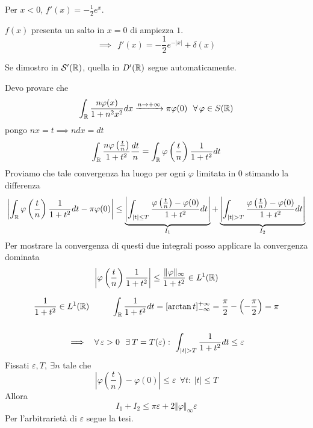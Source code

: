 Per $x < 0$, $f'(x) = - \frac{1}{2} e^{x}$.

$f(x)$ presenta un salto in $x = 0$ di ampiezza $1$.
\begin{equation*}
\implies \ \ f'(x) = - \frac{1}{2} e^{- | x|} + \delta (x)
\end{equation*}
\Soluzione


Se dimostro in $\mathcal{S} '(\mathbb{R})$, quella in $D'(\mathbb{R})$ segue automaticamente.

Devo provare che
\begin{equation*}
\int_{\RR}\frac{n\varphi (x)}{1 + n^{2} x^{2}} dx\xrightarrow{n\rightarrow + \infty} \pi \varphi (0) \ \ \forall \varphi \in S(\RR)
\end{equation*}
pongo $nx = t\implies ndx = dt$
\begin{equation*}
\int_{\mathbb{R}}\frac{n\varphi \left(\frac{t}{n}\right)}{1 + t^{2}}\frac{dt}{n} = \int_{\mathbb{R}} \varphi \left(\frac{t}{n}\right)\frac{1}{1 + t^{2}} dt
\end{equation*}
Proviamo che tale convergenza ha luogo per ogni $\varphi $ limitata in $0$ stimando la differenza
\begin{equation*}
\left| \int_{\mathbb{R}} \varphi \left(\frac{t}{n}\right)\frac{1}{1 + t^{2}} dt - \pi \varphi (0)\right| \leq \underbrace{\left| \int_{| t| \leq T}\frac{\varphi \left(\frac{t}{n}\right) - \varphi (0)}{1 + t^{2}} dt\right|}_{I_{1}} + \underbrace{\left| \int_{| t| > T}\frac{\varphi \left(\frac{t}{n}\right) - \varphi (0)}{1 + t^{2}} dt\right|}_{I_{2}}
\end{equation*}
Per mostrare la convergenza di questi due integrali posso applicare la convergenza dominata
\begin{equation*}
\left| \varphi \left(\frac{t}{n}\right)\frac{1}{1 + t^{2}}\right| \leq \frac{\Vert \varphi \Vert_{\infty}}{1 + t^{2}} \in L^{1}(\mathbb{R})
\end{equation*}
\begin{rem}
\begin{gather*}
\frac{1}{1 + t^{2}} \in L^{1}(\RR) \ \ \ \ \ \ \ \ \int_{\RR}\frac{1}{1 + t^{2}} dt = [\arctan t]^{+ \infty}_{- \infty} = \frac{\pi}{2} - \left(- \frac{\pi}{2}\right) = \pi \\
\\
\implies \ \ \forall \varepsilon > 0\ \ \exists T = T(\varepsilon) :\ \int_{| t| > T}\frac{1}{1 + t^{2}} dt \leq \varepsilon
\end{gather*}
Fissati $\varepsilon, T, \ \exists n$ tale che
\begin{equation*}
\left| \varphi \left(\frac{t}{n}\right) - \varphi (0)\right| \leq \varepsilon \ \ \forall t:\ | t| \leq T
\end{equation*}
Allora
\begin{equation*}
I_{1} + I_{2} \leq \pi \varepsilon + 2\Vert \varphi \Vert_{\infty} \varepsilon
\end{equation*}
Per l'arbitrarietà di $\varepsilon $ segue la tesi.
\end{rem}
\Soluzione

